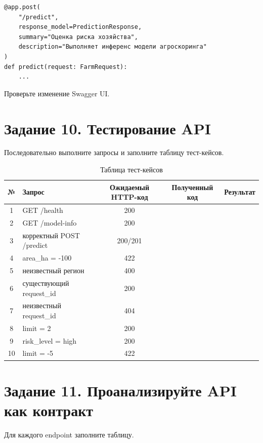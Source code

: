 \documentclass[12pt,a4paper]{article}
\begin{document}
\begin{lstlisting}[caption={Описание /predict}]
@app.post(
    "/predict",
    response_model=PredictionResponse,
    summary="Оценка риска хозяйства",
    description="Выполняет инференс модели агроскоринга"
)
def predict(request: FarmRequest):
    ...
\end{lstlisting}

Проверьте изменение Swagger UI.

\section{Задание 10. Тестирование API}

Последовательно выполните запросы и заполните таблицу тест-кейсов.

\begin{table}[H]
\centering
\caption{Таблица тест-кейсов}
\label{tab:test_cases}
\begin{tabular}{|c|p{5cm}|c|c|c|}
\hline
\textbf{№} & \textbf{Запрос} & \textbf{Ожидаемый HTTP-код} & \textbf{Полученный код} & \textbf{Результат} \\
\hline
1  & GET /health & 200 & & \\
2  & GET /model-info & 200 & & \\
3  & корректный POST /predict & 200/201 & & \\
4  & area\_ha = -100 & 422 & & \\
5  & неизвестный регион & 400 & & \\
6  & существующий request\_id & 200 & & \\
7  & неизвестный request\_id & 404 & & \\
8  & limit = 2 & 200 & & \\
9  & risk\_level = high & 200 & & \\
10 & limit = -5 & 422 & & \\
\hline
\end{tabular}
\end{table}

\section{Задание 11. Проанализируйте API как контракт}

Для каждого endpoint заполните таблицу.
\end{document}
